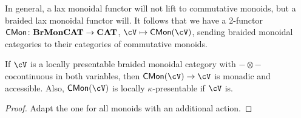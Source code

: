 \documentclass[a4paper,11pt,oneside,openany]{scrbook}
\begin{document}
\begin{rmk}
	In general, a lax monoidal functor will not lift to commutative monoids, but a braided lax monoidal functor will. It follows that we have a 2-functor $\operatorname{\mathsf{CMon}}\colon\textbf{BrMonCAT}\rightarrow{\normalfont\textbf{CAT}}$, $\cV\mapsto\CMon(\cV)$, sending braided monoidal categories to their categories of commutative monoids.
\end{rmk}

\begin{thm}
	If $\cV$ is a locally presentable braided monoidal category with $-\otimes -$ cocontinuous in both variables, then $\CMon(\cV)\rightarrow\cV$ is monadic and accessible. Also, $\CMon(\cV)$ is locally $\kappa$-presentable if $\cV$ is.
\end{thm}

\begin{proof}
	Adapt the one for all monoids with an additional action.
\end{proof}
\end{document}
